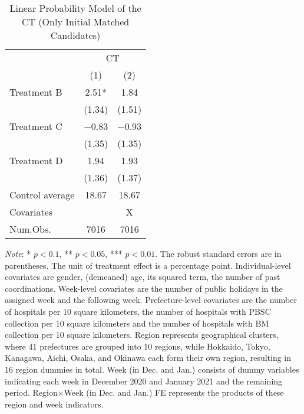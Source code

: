 \documentclass[12pt, a4paper]{article}
\begin{document}
\begin{table}[H]

\caption{\label{tab:lm-test-initial-matched}Linear Probability Model of the CT (Only Initial Matched Candidates)}
\centering
\fontsize{8}{10}\selectfont
\begin{threeparttable}
\begin{tabular}[t]{lcc}
\toprule
\multicolumn{1}{c}{ } & \multicolumn{2}{c}{CT} \\
\cmidrule(l{3pt}r{3pt}){2-3}
  & (1) & (2)\\
\midrule
Treatment B & \num{2.51}* & \num{1.84}\\
 & (\num{1.34}) & (\num{1.51})\\
Treatment C & \num{-0.83} & \num{-0.93}\\
 & (\num{1.35}) & (\num{1.35})\\
Treatment D & \num{1.94} & \num{1.93}\\
 & (\num{1.36}) & (\num{1.37})\\
\midrule
Control average & 18.67 & 18.67\\
Covariates &  & X\\
Num.Obs. & \num{7016} & \num{7016}\\
\bottomrule
\end{tabular}
\begin{tablenotes}
\item \emph{Note}: * $p < 0.1$, ** $p < 0.05$, *** $p < 0.01$. The robust standard errors are in parentheses. The unit of treatment effect is a percentage point. Individual-level covariates are gender, (demeaned) age, its squared term, the number of past coordinations. Week-level covariates are the number of public holidays in the assigned week and the following week. Prefecture-level covariates are the number of hospitals per 10 square kilometers, the number of hospitals with PBSC collection per 10 square kilometers and the number of hospitals with BM collection per 10 square kilometers. Region represents geographical clusters, where 41 prefectures are grouped into 10 regions, while Hokkaido, Tokyo, Kanagawa, Aichi, Osaka, and Okinawa each form their own region, resulting in 16 region dummies in total. Week (in Dec. and Jan.) consists of dummy variables indicating each week in December 2020 and January 2021 and the remaining period. Region$\times$Week (in Dec. and Jan.) FE represents the products of these region and week indicators.
\end{tablenotes}
\end{threeparttable}
\end{table}
\end{document}
